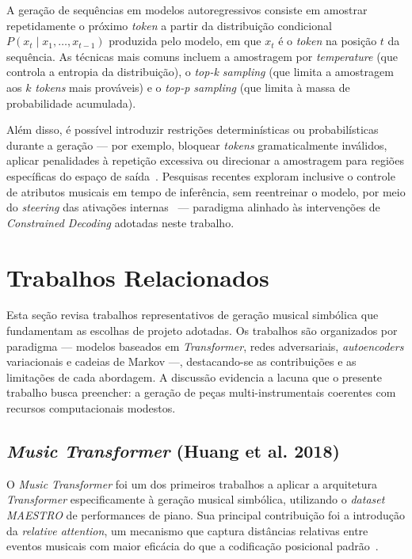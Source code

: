 \documentclass[12pt]{article}
\begin{document}
A geração de sequências em modelos autoregressivos consiste em amostrar
repetidamente o próximo \emph{token} a partir da distribuição condicional
$P(x_t \mid x_1, \ldots, x_{t-1})$ produzida pelo modelo, em que $x_t$ é o
\emph{token} na posição $t$ da sequência. As técnicas mais comuns incluem a
amostragem por \emph{temperature} (que controla a entropia da distribuição), o
\emph{top-k sampling} (que limita a amostragem aos $k$ \emph{tokens} mais
prováveis) e o \emph{top-p sampling} (que limita à massa de probabilidade
acumulada).

Além disso, é possível introduzir restrições determinísticas ou probabilísticas
durante a geração --- por exemplo, bloquear \emph{tokens} gramaticalmente
inválidos, aplicar penalidades à repetição excessiva ou direcionar a amostragem
para regiões específicas do espaço de saída~\cite{holtzman2020}. Pesquisas
recentes exploram inclusive o controle de atributos musicais em tempo de
inferência, sem reentreinar o modelo, por meio do \emph{steering} das ativações
internas~\cite{prokopiou2026} --- paradigma alinhado às intervenções de
\emph{Constrained Decoding} adotadas neste trabalho.

\section{Trabalhos Relacionados}

Esta seção revisa trabalhos representativos de geração musical simbólica que
fundamentam as escolhas de projeto adotadas. Os trabalhos são organizados por
paradigma --- modelos baseados em \emph{Transformer}, redes adversariais,
\emph{autoencoders} variacionais e cadeias de Markov ---, destacando-se as
contribuições e as limitações de cada abordagem. A discussão evidencia a lacuna
que o presente trabalho busca preencher: a geração de peças multi-instrumentais
coerentes com recursos computacionais modestos.

\subsection{\emph{Music Transformer} (Huang et al. 2018)}

O \emph{Music Transformer} foi um dos primeiros trabalhos a aplicar a arquitetura
\emph{Transformer} especificamente à geração musical simbólica, utilizando o
\emph{dataset} \emph{MAESTRO} de performances de piano. Sua principal contribuição foi a
introdução da \emph{relative attention}, um mecanismo que captura distâncias
relativas entre eventos musicais com maior eficácia do que a codificação
posicional padrão~\cite{huang2018}.
\end{document}
